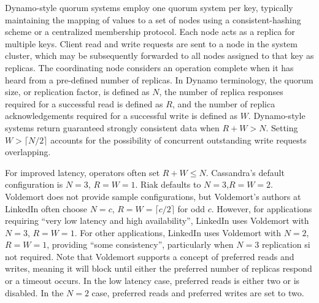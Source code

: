 \documentclass{vldb}
\begin{document}
Dynamo-style quorum systems employ one quorum system per key,
typically maintaining the mapping of values to a set of nodes using a
consistent-hashing scheme or a centralized membership protocol. Each
node acts as a replica for multiple keys.  Client read and write
requests are sent to a node in the system cluster, which may be
subsequently forwarded to all nodes assigned to that key as replicas.
The coordinating node considers an operation complete when it has
heard from a pre-defined number of replicas.  In Dynamo terminology,
the quorum size, or replication factor, is defined as $N$, the number
of replica responses required for a successful read is defined as $R$,
and the number of replica acknowledgements required for a successful
write is defined as $W$. Dynamo-style systems return guaranteed
strongly consistent data when $R+W > N$.  Setting $W>\lceil N/2 \rceil$ accounts for
the possibility of concurrent outstanding write requests overlapping.

For improved latency, operators often set $R+W \leq N$.  Cassandra's
default configuration is $N$$=$$3$, $R$$=$$W$$=$$1$.  Riak defaults
to $N$$=$$3$,$R$$=$$W$$=$$2$.  Voldemort does not provide sample
configurations, but Voldemort's authors at LinkedIn often choose $N$$=$$c$,
$R$$=$$W$$=$$ \lceil c/2 \rceil$ for odd $c$.  However, for applications
requiring ``very low latency and high availability'', LinkedIn uses
Voldemort with $N$$=$$3$, $R$$=$$W$$=$$1$.  For other applications, LinkedIn uses
Voldemort with $N$$=$$2$, $R$$=$$W$$=$$1$, providing ``some consistency'',
particularly when $N$$=$$3$ replication si not required.  Note that
Voldemort supports a concept of preferred reads and writes, meaning it
will block until either the preferred number of replicas respond or a
timeout occurs.  In the low latency case, preferred reads is either
two or is disabled.  In the $N$$=$$2$ case, preferred reads and preferred
writes are set to two.
\end{document}
